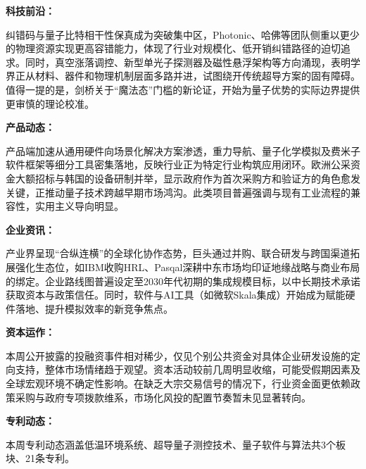 \documentclass[12pt,a4paper]{ctexart}
\begin{document}
\textbf{ 科技前沿：}

纠错码与量子比特相干性保真成为突破集中区，Photonic、哈佛等团队侧重以更少的物理资源实现更高容错能力，体现了行业对规模化、低开销纠错路径的迫切追求。同时，真空涨落调控、新型单光子探测器及磁性悬浮架构等方向涌现，表明学界正从材料、器件和物理机制层面多路并进，试图绕开传统超导方案的固有障碍。值得一提的是，剑桥关于“魔法态”门槛的新论证，开始为量子优势的实际边界提供更审慎的理论校准。


\textbf{ 产品动态：}

产品端加速从通用硬件向场景化解决方案渗透，重力导航、量子化学模拟及费米子软件框架等细分工具密集落地，反映行业正为特定行业构筑应用闭环。欧洲公采资金大额招标与韩国的设备研制并举，显示政府作为首次采购方和验证方的角色愈发关键，正推动量子技术跨越早期市场鸿沟。此类项目普遍强调与现有工业流程的兼容性，实用主义导向明显。


\textbf{ 企业资讯：}

产业界呈现“合纵连横”的全球化协作态势，巨头通过并购、联合研发与跨国渠道拓展强化生态位，如IBM收购HRL、Pasqal深耕中东市场均印证地缘战略与商业布局的绑定。企业路线图普遍设定至2030年代初期的集成规模目标，以中长期技术承诺获取资本与政策信任。同时，软件与AI工具（如微软Skala集成）开始成为赋能硬件落地、提升模拟效率的新竞争焦点。


\textbf{ 资本运作：}

本周公开披露的投融资事件相对稀少，仅见个别公共资金对具体企业研发设施的定向支持，整体市场情绪趋于观望。资本活动较前几周明显收缩，可能受假期因素及全球宏观环境不确定性影响。在缺乏大宗交易信号的情况下，行业资金面更依赖政策采购与政府专项拨款维系，市场化风投的配置节奏暂未见显著转向。




\textbf{ 专利动态：}

本周专利动态涵盖低温环境系统、超导量子测控技术、量子软件与算法共3个板块、21条专利。
\end{document}
